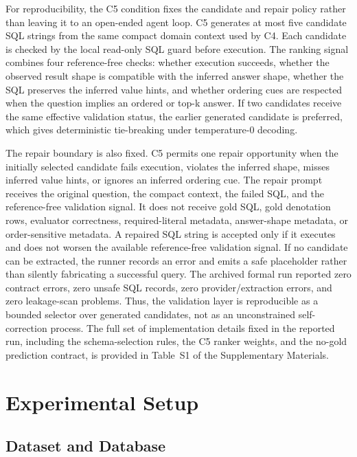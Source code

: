 \documentclass[cmc,article,submit,moreauthors,pdftex]{Definitions/tsp}
\begin{document}
For reproducibility, the C5 condition fixes the candidate and repair policy rather than leaving it to an open-ended agent loop. C5 generates at most five candidate SQL strings from the same compact domain context used by C4. Each candidate is checked by the local read-only SQL guard before execution. The ranking signal combines four reference-free checks: whether execution succeeds, whether the observed result shape is compatible with the inferred answer shape, whether the SQL preserves the inferred value hints, and whether ordering cues are respected when the question implies an ordered or top-k answer. If two candidates receive the same effective validation status, the earlier generated candidate is preferred, which gives deterministic tie-breaking under temperature-0 decoding.

The repair boundary is also fixed. C5 permits one repair opportunity when the initially selected candidate fails execution, violates the inferred shape, misses inferred value hints, or ignores an inferred ordering cue. The repair prompt receives the original question, the compact context, the failed SQL, and the reference-free validation signal. It does not receive gold SQL, gold denotation rows, evaluator correctness, required-literal metadata, answer-shape metadata, or order-sensitive metadata. A repaired SQL string is accepted only if it executes and does not worsen the available reference-free validation signal. If no candidate can be extracted, the runner records an error and emits a safe placeholder rather than silently fabricating a successful query. The archived formal run reported zero contract errors, zero unsafe SQL records, zero provider/extraction errors, and zero leakage-scan problems. Thus, the validation layer is reproducible as a bounded selector over generated candidates, not as an unconstrained self-correction process. The full set of implementation details fixed in the reported run, including the schema-selection rules, the C5 ranker weights, and the no-gold prediction contract, is provided in Table~S1 of the Supplementary Materials.

\section{Experimental Setup}\label{experiments}

\subsection{Dataset and Database}\label{sect:e1}
\end{document}
